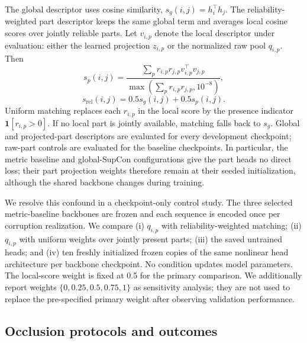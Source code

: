 \documentclass[pdflatex,iicol,sn-apa]{sn-jnl}
\begin{document}
The global descriptor uses cosine similarity,
$s_g(i,j)=h_i^\top h_j$. The reliability-weighted part descriptor keeps the
same global term and averages local cosine scores over jointly reliable parts.
Let $v_{i,p}$ denote the local descriptor under evaluation: either the learned
projection $z_{i,p}$ or the normalized raw pool $q_{i,p}$. Then
\begin{equation}
 s_p(i,j)=
 \frac{\sum_p r_{i,p}r_{j,p}v_{i,p}^{\top}v_{j,p}}
 {\max(\sum_p r_{i,p}r_{j,p},10^{-8})},
\end{equation}
\begin{equation}
 s_{\mathrm{rel}}(i,j)=0.5s_g(i,j)+0.5s_p(i,j).
 \label{eq:matching}
\end{equation}
Uniform matching replaces each $r_{i,p}$ in the local score by the presence
indicator $\mathbf{1}[r_{i,p}>0]$. If no local part is jointly available,
matching falls back to $s_g$. Global and projected-part descriptors are
evaluated for every development checkpoint; raw-part controls are evaluated
for the baseline checkpoints. In particular, the metric
baseline and global-SupCon configurations give the part heads no direct loss;
their part projection weights therefore remain at their seeded initialization,
although the shared backbone changes during training.

We resolve this confound in a checkpoint-only control study. The three selected
metric-baseline backbones are frozen and each sequence is encoded once per
corruption realization. We compare (i) $q_{i,p}$ with reliability-weighted
matching; (ii) $q_{i,p}$ with uniform weights over jointly present parts; (iii)
the saved untrained heads; and (iv) ten freshly initialized frozen copies of
the same nonlinear head architecture per backbone checkpoint. No condition
updates model parameters. The local-score weight is fixed at 0.5 for the
primary comparison. We additionally report weights
$\{0,0.25,0.5,0.75,1\}$ as sensitivity analysis; they are not used to replace
the pre-specified primary weight after observing validation performance.

\subsection{Occlusion protocols and outcomes}
\end{document}
